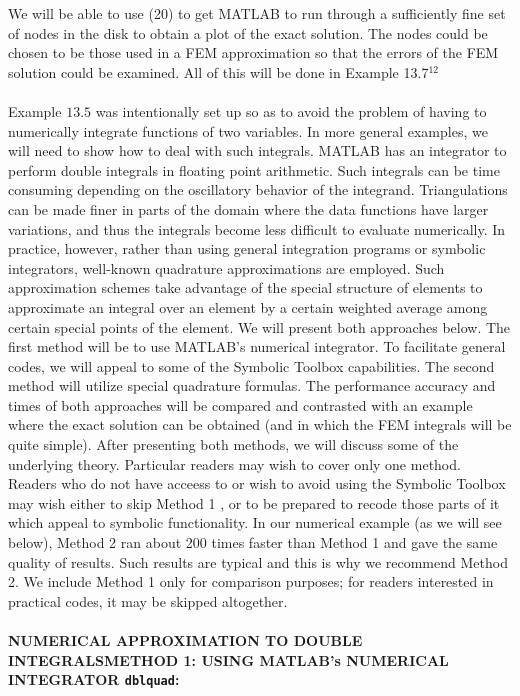\documentclass[../main.tex]{subfiles}
\begin{document}
We will be able to use (20) to get MATLAB to run through a sufficiently fine set of nodes in the disk to obtain a plot of the exact solution. The nodes could be chosen to be those used in a FEM approximation so that the errors of the FEM solution could be examined. All of this will be done in Example 13.7$^{12}$
\\
\\
Example $13.5$ was intentionally set up so as to avoid the problem of having to numerically integrate functions of two variables. In more general examples, we will need to show how to deal with such integrals. MATLAB has an integrator to perform double integrals in floating point arithmetic. Such integrals can be time consuming depending on the oscillatory behavior of the integrand. Triangulations can be made finer in parts of the domain where the data functions have larger variations, and thus the integrals become less difficult to evaluate numerically. In practice, however, rather than using general integration programs or symbolic integrators, well-known quadrature approximations are employed. Such approximation schemes take advantage of the special structure of elements to approximate an integral over an element by a certain weighted average among certain special points of the element. We will present both approaches below. The first method will be to use MATLAB's numerical integrator. To facilitate general codes, we will appeal to some of the Symbolic Toolbox capabilities. The second method will utilize special quadrature formulas. The performance accuracy and times of both approaches will be compared and contrasted with an example where the exact solution can be obtained (and in which the FEM integrals will be quite simple). After presenting both methods, we will discuss some of the underlying theory. Particular readers may wish to cover only one method. Readers who do not have acceess to or wish to avoid using the Symbolic Toolbox may wish either to skip Method 1 , or to be prepared to recode those parts of it which appeal to symbolic functionality. In our numerical example (as we will see below), Method 2 ran about 200 times faster than Method 1 and gave the same quality of results. Such results are typical and this is why we recommend Method
2. We include Method 1 only for comparison purposes; for readers interested in practical codes, it may be skipped altogether.
\\
\\
\textbf{NUMERICAL APPROXIMATION TO DOUBLE INTEGRALSMETHOD 1: USING MATLAB's NUMERICAL INTEGRATOR \texttt{dblquad}:}
\end{document}
